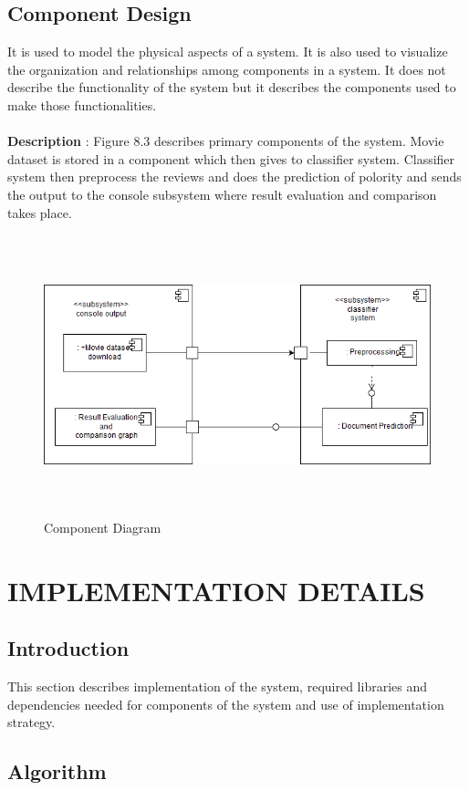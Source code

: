 \documentclass[oneside,a4paper,12pt]{pictreport}
\begin{document}
\section{Component Design}
It is used to model the physical aspects of a system. It is also used to visualize the organization and relationships among components in a system. It does not describe the functionality of the system but it describes the components used to make those functionalities.\\\\
\textbf{Description} : Figure 8.3 describes primary components of the system.
Movie dataset is stored in a component which then gives to classifier system.
Classifier system then preprocess the reviews and does the prediction of polority and sends the output
to the console subsystem where result evaluation and comparison takes place.
\begin{figure}[h!]
\includegraphics[width=5.2in,height=3.2in]{Component_.png}
\caption{Component Diagram}
\end{figure}

\chapter{IMPLEMENTATION DETAILS}
\section{Introduction}
This section describes implementation of the system, required libraries and dependencies needed for components of the system and use of implementation strategy.
\section{Algorithm}
\end{document}
